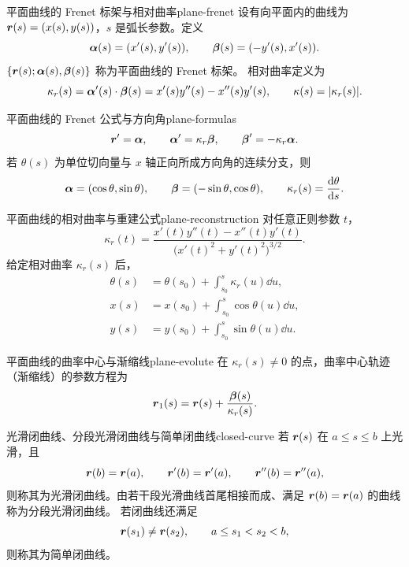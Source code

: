 \begin{definition}{平面曲线的 Frenet 标架与相对曲率}{plane-frenet}
设有向平面内的曲线为 $\boldsymbol{r}(s)=(x(s),y(s))$，$s$ 是弧长参数。定义
\[
\boldsymbol{\alpha}(s)=(x'(s),y'(s)),\qquad
\boldsymbol{\beta}(s)=(-y'(s),x'(s)).
\]
$\{\boldsymbol{r}(s);\boldsymbol{\alpha}(s),\boldsymbol{\beta}(s)\}$ 称为平面曲线的 Frenet 标架。
相对曲率定义为
\[
\kappa_r(s)=\boldsymbol{\alpha}'(s)\cdot\boldsymbol{\beta}(s)
=x'(s)y''(s)-x''(s)y'(s),\qquad\kappa(s)=|\kappa_r(s)|.
\]
\end{definition}

\begin{proposition}{平面曲线的 Frenet 公式与方向角}{plane-formulas}
\[
\boldsymbol{r}'=\boldsymbol{\alpha},\qquad
\boldsymbol{\alpha}'=\kappa_r\boldsymbol{\beta},\qquad
\boldsymbol{\beta}'=-\kappa_r\boldsymbol{\alpha}.
\]
若 $\theta(s)$ 为单位切向量与 $x$ 轴正向所成方向角的连续分支，则
\[
\boldsymbol{\alpha}=(\cos\theta,\sin\theta),\qquad
\boldsymbol{\beta}=(-\sin\theta,\cos\theta),\qquad
\kappa_r(s)=\frac{\mathrm{d}\theta}{\mathrm{d} s}.
\]
\end{proposition}

\begin{proposition}{平面曲线的相对曲率与重建公式}{plane-reconstruction}
对任意正则参数 $t$，
\[
\kappa_r(t)=\frac{x'(t)y''(t)-x''(t)y'(t)}
{\bigl(x'(t)^2+y'(t)^2\bigr)^{3/2}}.
\]
给定相对曲率 $\kappa_r(s)$ 后，
\[
\begin{aligned}
\theta(s)&=\theta(s_0)+\int_{s_0}^s\kappa_r(u)\dd u,\\
x(s)&=x(s_0)+\int_{s_0}^s\cos\theta(u)\dd u,\\
y(s)&=y(s_0)+\int_{s_0}^s\sin\theta(u)\dd u.
\end{aligned}
\]
\end{proposition}

\begin{proposition}{平面曲线的曲率中心与渐缩线}{plane-evolute}
在 $\kappa_r(s)\neq0$ 的点，曲率中心轨迹（渐缩线）的参数方程为
\[
\boldsymbol{r}_1(s)=\boldsymbol{r}(s)+\frac{\boldsymbol{\beta}(s)}{\kappa_r(s)}.
\]
\end{proposition}

\begin{definition}{光滑闭曲线、分段光滑闭曲线与简单闭曲线}{closed-curve}
若 $\boldsymbol{r}(s)$ 在 $a\leq s\leq b$ 上光滑，且
\[
\boldsymbol{r}(b)=\boldsymbol{r}(a),\qquad
\boldsymbol{r}'(b)=\boldsymbol{r}'(a),\qquad
\boldsymbol{r}''(b)=\boldsymbol{r}''(a),
\]
则称其为光滑闭曲线。由若干段光滑曲线首尾相接而成、满足
$\boldsymbol{r}(b)=\boldsymbol{r}(a)$ 的曲线称为分段光滑闭曲线。
若闭曲线还满足
\[
\boldsymbol{r}(s_1)\neq\boldsymbol{r}(s_2),\qquad a\leq s_1<s_2<b,
\]
则称其为简单闭曲线。
\end{definition}

